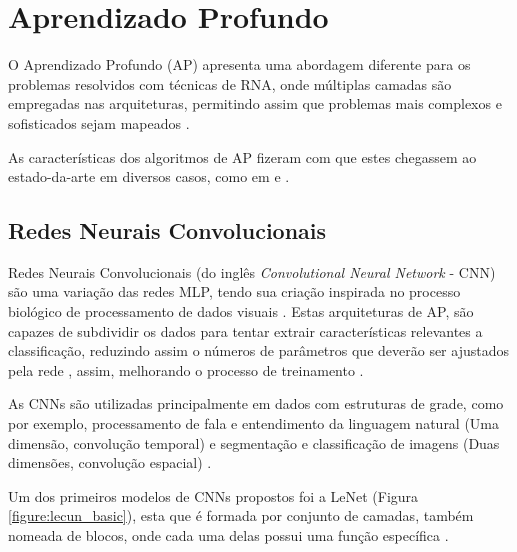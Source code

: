 \section{Aprendizado Profundo}

\par O Aprendizado Profundo (AP) apresenta uma abordagem diferente para os problemas resolvidos com técnicas de RNA, onde múltiplas camadas são empregadas nas arquiteturas, permitindo assim que problemas mais complexos e sofisticados sejam mapeados \cite{Goodfellow-et-al-2016}.

\par As características dos algoritmos de AP fizeram com que estes chegassem ao estado-da-arte em diversos casos, como em  e . 

\subsection{Redes Neurais Convolucionais}

\par Redes Neurais Convolucionais (do inglês \textit{Convolutional Neural Network} - CNN) são uma variação das redes MLP, tendo sua criação inspirada no processo biológico de processamento de dados visuais \cite{Caroline2016}. Estas arquiteturas de AP, são capazes de subdividir os dados para tentar extrair características relevantes a classificação, reduzindo assim o números de parâmetros que deverão ser ajustados pela rede \cite{Miyazaki2017}, assim, melhorando o processo de treinamento \cite{Miyazaki2017}. %

\par As CNNs são utilizadas principalmente em dados com estruturas de grade, como por exemplo, processamento de fala e entendimento da linguagem natural (Uma dimensão, convolução temporal) \cite{Miyazaki2017} e segmentação e classificação de imagens (Duas dimensões, convolução espacial) \cite{Miyazaki2017, Goodfellow-et-al-2016}.

\par Um dos primeiros modelos de CNNs propostos foi a LeNet \cite{LeCun1998} (Figura \ref{figure:lecun_basic}), esta que é formada por conjunto de camadas, também nomeada de blocos, onde cada uma delas possui uma função específica \cite{Carneiro2017}. 


